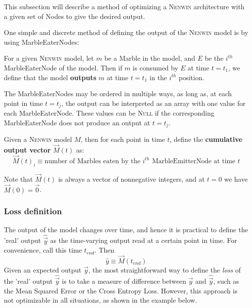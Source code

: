 This subsection will describe a method of optimizing a \textsc{Nenwin} architecture with a given set of Nodes to give the desired output. 

One simple and discrete method of defining the output of the \textsc{Nenwin} model is by using MarbleEaterNodes:

\begin{definition}[output]
For a given \textsc{Nenwin} model, let $m$ be a Marble in the model, and $E$ be the $i^{th}$ MarbleEaterNode of the model. Then if $m$ is consumed by $E$ at  time $t = t_1$, we define that the model \textbf{outputs} $m$ at time $t = t_1$ in the $i^{th}$ position. 
\end{definition}
The MarbleEaterNodes may be ordered in multiple ways, as long as, at each point in time $t = t_j$, the output can be interpreted as an array with one value for each MarbleEaterNode. These values can be \textsc{Null} if the corresponding MarbleEaterNode does not produce an output at $t = t_j$.

\begin{definition} \label{def:cumul_output_vect}
Given a \textsc{Nenwin} model $M$, then for each point in time $t$, define the \textbf{cumulative output vector} $\vec{M}(t)$ as:
\begin{equation}
    \vec{M}(t)_i \equiv \text{number of Marbles eaten by the $i^{th}$ MarbleEmitterNode at time $t$}
\end{equation}
\end{definition}
Note that $\vec{M}(t)$ is always a vector of nonnegative integers, and at $t = 0$ we have $\vec{M}(0) = \vec{0}$.
\subsubsection{Loss definition}
The output of the model changes over time, and hence it is practical to define the 'real' output $\hat{\vec{y}}$ as the time-varying output read at a certain point in time. For convenience, call this time $t_{end}$. Then \begin{equation}
    \hat{y} \equiv \vec{M}(t_{end})
\end{equation} Given an expected output $\vec{y}$, the most straightforward way to define the \textit{loss} of the 'real' output $\hat{\vec{y}}$ is to take a measure of difference between $\vec{y}$ and $\hat{\vec{y}}$, such as the Mean Squared Error or the Cross Entropy Loss. However, this approach is not optimizable in all situations, as shown in the example below.

